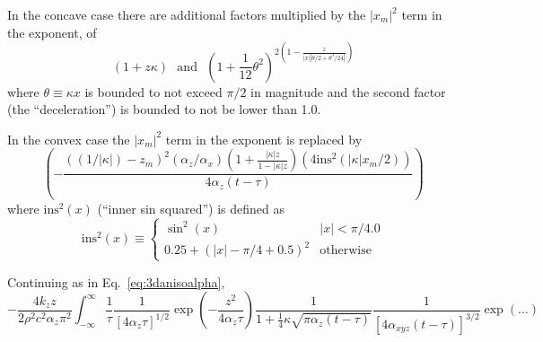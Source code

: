 \documentclass[letterpaper]{article}
\begin{document}
In the concave case there are additional factors multiplied by the $|x_{m}|^{2}$ term in the exponent, of
\begin{equation}
(1 + z\kappa) \ \ \ \mbox{and}\ \ \ \left(1+\frac{1}{12}\theta^{2}\right)^{2\left(1-\frac{z}{|x||\theta/2 + \theta^{3}/24|}\right)}
\end{equation}
where $\theta \equiv \kappa x$ is bounded to not exceed $\pi/2$ in magnitude
and the second factor (the ``deceleration'') is bounded to not be lower than 1.0.

In the convex case the $|x_{m}|^{2}$ term in the exponent is replaced
by 
\begin{equation}
  \left( -\frac{((1/|\kappa|) - z_{m})^{2}(\alpha_{z}/\alpha_{x})\left(1+\frac{|\kappa| z}{1-|\kappa| z}\right)\left(4\mbox{ins}^{2}(|\kappa|x_{m}/2)\right)}{4\alpha_{z}(t-\tau)}   \right)
\end{equation}
where
$\mbox{ins}^{2}(x)$ (``inner sin squared'') is defined as
\begin{equation}
\mbox{ins}^{2}(x) \equiv \begin{cases} \sin^{2}(x) & |x| < \pi/4.0 \\ 0.25 + (|x| - \pi/4 + 0.5)^{2} & \mbox{otherwise} \end{cases} 
\end{equation}

Continuing as in Eq.~\ref{eq:3danisoalpha},
\begin{equation}
-\frac{4k_{z}z}{2\rho^{2} c^{2}\alpha_{z}\pi^{2}} \int_{-\infty}^{\infty}\frac{1}{\tau}\frac{1}{\left[4\alpha_{z}\tau\right]^{1/2}}\exp\left(-\frac{z^{2}}{4\alpha_{z}\tau}\right)\frac{1}{1+\frac{1}{4}\kappa \sqrt{\pi\alpha_{z}(t-\tau)}}\frac{1}{\left[4\alpha_{xyz}(t-\tau)\right]^{3/2}}\exp\left( ... \right)
\end{equation}
\end{document}
